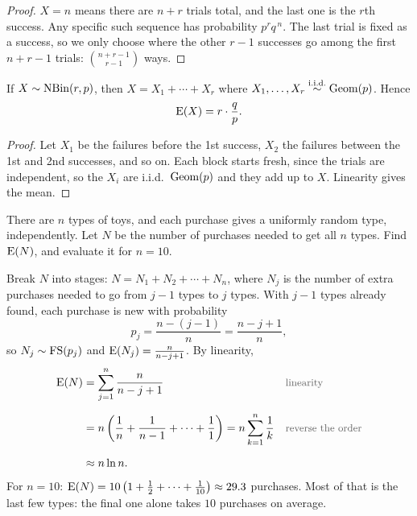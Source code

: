 \medskip

\begin{proof}
$X = n$ means there are $n + r$ trials total, and the last one is the $r$th success. Any specific such sequence has probability $p^{r}q^{\,n}$. The last trial is fixed as a success, so we only choose where the other $r - 1$ successes go among the first $n + r - 1$ trials: $\binom{n + r - 1}{r - 1}$ ways.
\end{proof}

\bigskip

\begin{theorem}\label{thm:nbinsum}
If $X \sim \operatorname{NBin}(r, p)$, then $X = X_1 + \cdots + X_r$ where $X_1, \dots, X_r \overset{\text{i.i.d.}}{\sim} \operatorname{Geom}(p)$. Hence
\medskip
\[
\operatorname{E}(X) = r \cdot \frac{q}{p}.
\]
\end{theorem}

\medskip

\begin{proof}
Let $X_1$ be the failures before the 1st success, $X_2$ the failures between the 1st and 2nd successes, and so on. Each block starts fresh, since the trials are independent, so the $X_i$ are i.i.d.\ $\operatorname{Geom}(p)$ and they add up to $X$. Linearity gives the mean.
\end{proof}

\bigskip

\begin{example}\label{ex:coupon}
There are $n$ types of toys, and each purchase gives a uniformly random type, independently. Let $N$ be the number of purchases needed to get all $n$ types. Find $\operatorname{E}(N)$, and evaluate it for $n = 10$.
\end{example}

\medskip

\begin{solution}
Break $N$ into stages: $N = N_1 + N_2 + \cdots + N_n$, where $N_j$ is the number of extra purchases needed to go from $j - 1$ types to $j$ types. With $j - 1$ types already found, each purchase is new with probability
\medskip
\[
p_j = \frac{n - (j - 1)}{n} = \frac{n - j + 1}{n},
\]
\medskip
so $N_j \sim \operatorname{FS}(p_j)$ and $\operatorname{E}(N_j) = \frac{n}{n - j + 1}$. By linearity,
\medskip
\begin{align*}
\E(N)
  &= \sum_{j=1}^{n} \frac{n}{n - j + 1}
  && \by{linearity} \\[0.6em]
  &= n\left(\frac{1}{n} + \frac{1}{n-1} + \cdots + \frac{1}{1}\right)
   = n \sum_{k=1}^{n} \frac{1}{k}
  && \by{reverse the order} \\[0.6em]
  &\approx n \ln n.
\end{align*}
\medskip
For $n = 10$: $\operatorname{E}(N) = 10\left(1 + \tfrac12 + \cdots + \tfrac{1}{10}\right) \approx 29.3$ purchases. Most of that is the last few types: the final one alone takes $10$ purchases on average.
\end{solution}

